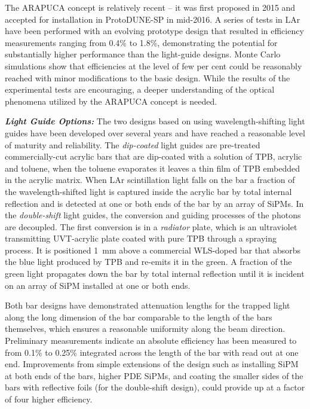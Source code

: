 The ARAPUCA concept is relatively recent -- it was first proposed in 2015 and accepted for installation in ProtoDUNE-SP in mid-2016. A series of tests in LAr have been performed with an evolving prototype design that resulted in efficiency measurements ranging from  \num{0.4}\% to \num{1.8}\%, demonstrating the potential for substantially higher performance than the light-guide designs. Monte Carlo simulations show that efficiencies at the level of few per cent could be reasonably reached with minor modifications to the basic design. 
While the results of the experimental tests are encouraging, a deeper understanding of the optical phenomena utilized by the ARAPUCA concept is needed.

{\it\bf Light Guide Options:} The two designs based on using wavelength-shifting light guides have been developed over several years and have reached a reasonable level of maturity and reliability. 
The {\it dip-coated} light guides are pre-treated commercially-cut acrylic bars that are dip-coated with a solution of TPB, acrylic and toluene, when the toluene evaporates it leaves a thin film of TPB embedded in the acrylic matrix.  When LAr scintillation light falls on the bar a fraction of the wavelength-shifted light is captured inside the acrylic bar by total internal reflection and is detected at one or both ends of the bar by an array of SiPMs.
In the {\it double-shift} light guides, the conversion and guiding processes of the photons are decoupled. The first conversion is in a {\it radiator} plate, which is an ultraviolet transmitting UVT-acrylic plate coated with pure TPB through a spraying process. It is positioned \SI{1}{mm} above a commercial WLS-doped bar that absorbs the blue light produced by TPB and re-emits it in the green.
 A fraction of the green light propagates down the bar by total internal reflection until it is incident on an
array of SiPM installed at one or both ends. 

Both bar designs have demonstrated attenuation lengths for the  trapped light along the long dimension of the bar comparable to the length of the bars themselves, which ensures a reasonable uniformity along the beam direction. Preliminary measurements indicate an absolute efficiency has been measured to from \num{0.1}\% to \num{0.25}\% integrated across the length of the bar with read out at one end. 
 Improvements from simple extensions of the design such as installing SiPM at both ends of the bars, higher PDE SiPMs, and coating the smaller sides of the bars with reflective foils (for the double-shift design), could provide up at a factor of four higher efficiency. 

